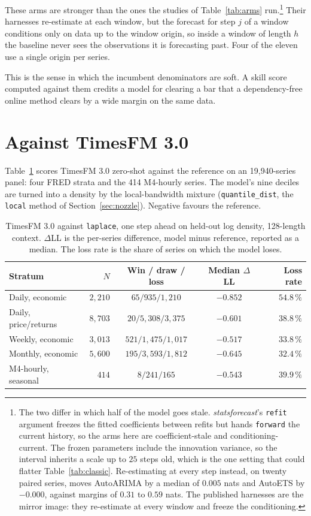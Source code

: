 \documentclass[article]{jss}
\providecommand{\proglang}[1]{\textsf{#1}}
\providecommand{\pkg}[1]{\textit{#1}}
\renewcommand{\pkg}[1]{\textit{#1}}
\providecommand{\code}[1]{\texttt{#1}}
\begin{document}
These arms are stronger than the ones the studies of Table~\ref{tab:arms}
run.\footnote{The two differ in which half of the model goes stale.
\pkg{statsforecast}'s \code{refit} argument freezes the fitted coefficients
between refits but hands \code{forward} the current history, so the arms here
are coefficient-stale and conditioning-current. The frozen parameters include
the innovation variance, so the interval inherits a scale up to $25$ steps old,
which is the one setting that could flatter Table~\ref{tab:classic}.
Re-estimating at every step instead, on twenty paired series, moves AutoARIMA by
a median of $0.005$ nats and AutoETS by $-0.000$, against margins of $0.31$ to
$0.59$ nats. The published harnesses are the mirror image: they re-estimate at
every window and freeze the conditioning.} Their harnesses re-estimate at each
window, but the forecast for step $j$ of a window conditions only on data up to
the window origin, so inside a window of length $h$ the baseline never sees the
observations it is forecasting past. Four of the eleven use a single origin per
series.

This is the sense in which the incumbent denominators are soft. A skill score
computed against them credits a model for clearing a bar that a dependency-free
online method clears by a wide margin on the same data.

\section{Against TimesFM 3.0}\label{sec:results}

Table~\ref{tab:raw} scores TimesFM 3.0 \citep{das2024timesfm} zero-shot against
the reference on an 19{,}940-series panel: four \proglang{FRED} strata and the
414 M4-hourly series. The model's nine deciles are turned into a density by the
local-bandwidth mixture (\code{quantile\_dist}, the \code{local} method of
Section~\ref{sec:nozzle}). Negative favours the reference.

\begin{table}[t!]
\centering
\begin{tabular}{lrccr}
\toprule
Stratum & $N$ & Win / draw / loss & Median $\Delta$LL & Loss rate \\
\midrule
Daily, economic       & $2{,}210$ & $65 / 935 / 1{,}210$ & $-0.852$ & $54.8\,\%$ \\
Daily, price/returns  & $8{,}703$ & $20 / 5{,}308 / 3{,}375$ & $-0.601$ & $38.8\,\%$ \\
Weekly, economic      & $3{,}013$ & $521 / 1{,}475 / 1{,}017$ & $-0.517$ & $33.8\,\%$ \\
Monthly, economic     & $5{,}600$ & $195 / 3{,}593 / 1{,}812$ & $-0.645$ & $32.4\,\%$ \\
M4-hourly, seasonal   & $414$ & $8 / 241 / 165$ & $-0.543$ & $39.9\,\%$ \\
\bottomrule
\end{tabular}
\caption{TimesFM 3.0 against \code{laplace}, one step ahead on held-out log
density, 128-length context. $\Delta$LL is the per-series difference, model
minus reference, reported as a median. The loss rate is the share of series on
which the model loses.}
\label{tab:raw}
\end{table}
\end{document}
